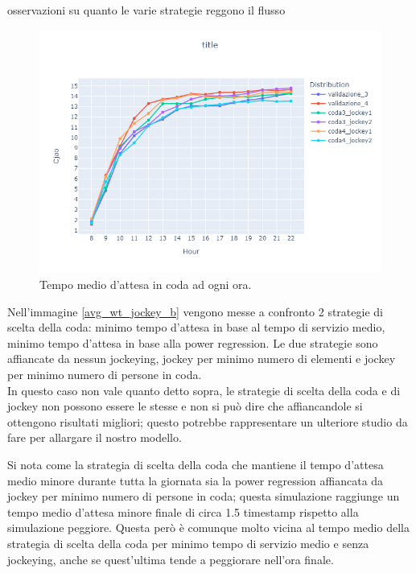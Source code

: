 
osservazioni su quanto le varie strategie reggono il flusso

\begin{figure}[htp!]
	\centering
	\includegraphics[width=12cm]{"images/results/avg_wt_jockey_b.png"}
	\caption{Tempo medio d'attesa in coda ad ogni ora.}
	\label{fig:avg_wt_jockey_b}
\end{figure}

Nell'immagine \ref{avg_wt_jockey_b} vengono messe a confronto 2 strategie di scelta della coda: minimo tempo d'attesa in base al tempo di servizio medio, minimo tempo d'attesa in base alla power regression. Le due strategie sono affiancate da nessun jockeying, jockey per minimo numero di elementi e jockey per minimo numero di persone in coda. \\
In questo caso non vale quanto detto sopra, le strategie di scelta della coda e di jockey non possono essere le stesse e non si può dire che affiancandole si ottengono risultati migliori; questo potrebbe rappresentare un ulteriore studio da fare per allargare il nostro modello.

Si nota come la strategia di scelta della coda che mantiene il tempo d'attesa medio minore durante tutta la giornata sia la power regression affiancata da jockey per minimo numero di persone in coda; questa simulazione raggiunge un tempo medio d'attesa minore finale di circa 1.5 timestamp rispetto alla simulazione peggiore. Questa però è comunque molto vicina al tempo medio della strategia di scelta della coda per minimo tempo di servizio medio e senza jockeying, anche se quest'ultima tende a peggiorare nell'ora finale.


